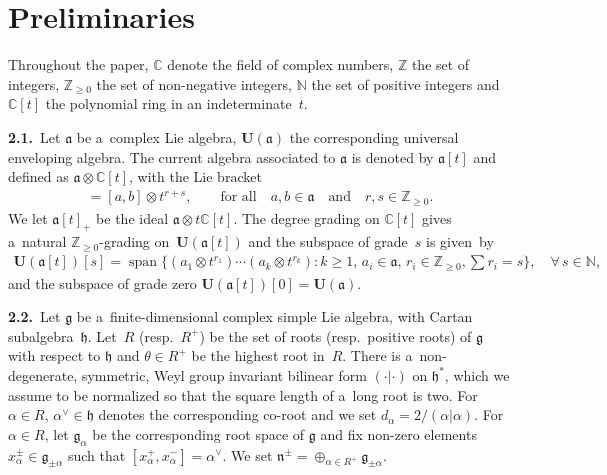 \documentclass[11pt]{article}
\DeclareMathOperator{\spn}{span}
\numberwithin{equation}{section}
\begin{document}
\section{Preliminaries}\label{section2}

Throughout the paper, $\mathbb{C}$ denote the f\/ield of complex numbers, $\mathbb{Z}$ the set of integers,
$\mathbb{Z}_{\geq 0}$ the set of non-negative integers, $\mathbb{N}$ the set of positive integers and $\mathbb{C}[t]$
the polynomial ring in an indeterminate~$t$.

{\bf 2.1.}~Let $\mathfrak{a}$ be a~complex Lie algebra, $\mathbf{U}(\mathfrak{a})$ the corresponding universal
enveloping algebra.
The current algebra associated to $\mathfrak{a}$ is denoted by $\mathfrak{a}[t]$ and def\/ined as $\mathfrak{a} \otimes
\mathbb{C}[t]$, with the Lie bracket
\begin{gather*}
[a \otimes t^r, b \otimes t^s]=[a, b]\otimes t^{r+s},
\qquad
\text{for all}
\quad
a, b \in \mathfrak{a}
\quad
\text{and}
\quad
r, s \in \mathbb{Z}_{\geq 0}.
\end{gather*}
We let $\mathfrak{a}[t]_{+}$ be the ideal $\mathfrak{a}\otimes t\mathbb{C}[t]$. The degree grading on $\mathbb{C}[t]$
gives a~natural $\mathbb{Z}_{\geq 0}$-grading on~$\mathbf{U}(\mathfrak{a}[t])$ and the subspace of grade~$s$ is given~by
\begin{gather*}
\mathbf{U}(\mathfrak{a}[t])[s]= \spn \Big\{(a_1\otimes t^{r_1})\cdots (a_k\otimes t^{r_k}):k\geq 1,\,
a_i\in\mathfrak{a},\, r_i\in \mathbb{Z}_{\geq 0}, \sum r_i=s\Big\},
\quad
\forall\, s\in \mathbb{N},
\end{gather*}
and the subspace of grade zero $\mathbf{U}(\mathfrak{a}[t])[0]=\mathbf{U}(\mathfrak{a})$.

{\bf 2.2.}~Let $\mathfrak{g}$ be a~f\/inite-dimensional complex simple Lie algebra, with Cartan subalgebra~$\mathfrak{h}$.
Let~$R$ (resp.~$R^+$) be the set of roots (resp.\
positive roots) of $\mathfrak{g}$ with respect to $\mathfrak{h}$ and $\theta \in R^+$ be the highest root in~$R$.
There is a~non-degenerate, symmetric, Weyl group invariant bilinear form $(\cdot|\cdot)$ on $\mathfrak{h}^*$, which we assume to
be normalized so that the square length of a~long root is two.
For $\alpha\in R$, $\alpha^{\vee}\in\mathfrak{h}$ denotes the corresponding co-root and we set
$d_{\alpha}=2/(\alpha|\alpha)$. For $\alpha\in R$, let $\mathfrak{g}_{\alpha}$ be the corresponding root space of
$\mathfrak{g}$ and f\/ix non-zero elements $x^{\pm}_{\alpha}\in \mathfrak{g}_{\pm\alpha}$ such that $[x^{+}_{\alpha},x^{-}_{\alpha}]=\alpha^{\vee}$.
We set $\mathfrak{n}^{\pm}=\oplus_{\alpha\in R^{+}}  \mathfrak{g}_{\pm\alpha}$.
\end{document}
